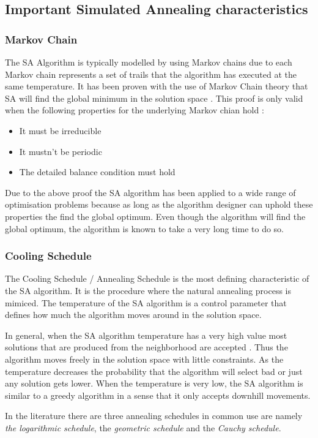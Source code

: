 \subsection{Important Simulated Annealing characteristics}
\subsubsection{Markov Chain}
The SA Algorithm is typically modelled by using Markov chains due to each Markov chain represents a set of trails that the algorithm has executed at the same temperature.  It has been proven with the use of Markov Chain theory that SA will find the global minimum in the solution space \cite{ClusterSA}. This proof is only valid when the following properties for the underlying Markov chian hold \cite{VeryFastSAImageEnchancement}:
\begin{itemize}
\item It must be irreducible
\item It mustn't be periodic
\item The detailed balance condition must hold
\end{itemize}
Due to the above proof the SA algorithm has been applied to a wide range of optimisation problems because as long as the algorithm designer can uphold these properties the find the global optimum. Even though the algorithm will find the global optimum, the algorithm is known to take a very long time to do so.
\subsubsection{Cooling Schedule}
The Cooling Schedule / Annealing Schedule is the most defining characteristic of the SA algorithm. It is the procedure where the natural annealing process is mimiced. The temperature of the SA algorithm is a control parameter that defines how much the algorithm moves around in the solution space.

In general, when the SA algorithm temperature has a very high value most solutions that are produced from the neighborhood are accepted \cite{ClusterSA}. Thus the algorithm moves freely in the solution space with little constraints. As the temperature decreases the probability that the algorithm will select bad or just any solution gets lower. When the temperature is very low, the SA algorithm is similar to a greedy algorithm in a sense that it only accepts downhill movements\cite{ClusterSA}.

In the literature there are three annealing schedules in common use are namely \emph{the logarithmic schedule}, the \emph{geometric schedule} and the \emph{Cauchy schedule}\cite{VeryFastSAImageEnchancement,SASingleMultiObj}. 

